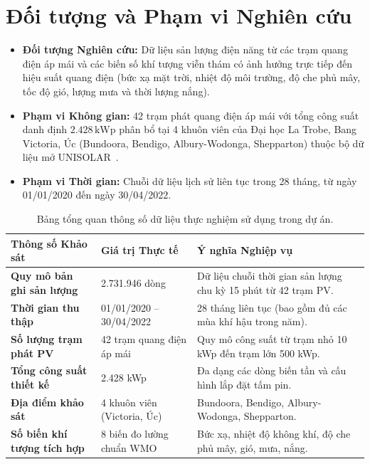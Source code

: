 \documentclass[12pt, a4paper]{report}
\begin{document}
\section{Đối tượng và Phạm vi Nghiên cứu}
\label{sec:phamvi}

\begin{itemize}[noitemsep]
    \item \textbf{Đối tượng Nghiên cứu:} Dữ liệu sản lượng điện năng từ các trạm quang điện áp mái và các biến số khí tượng viễn thám có ảnh hưởng trực tiếp đến hiệu suất quang điện (bức xạ mặt trời, nhiệt độ môi trường, độ che phủ mây, tốc độ gió, lượng mưa và thời lượng nắng).
    \item \textbf{Phạm vi Không gian:} 42 trạm phát quang điện áp mái với tổng công suất danh định $2.428\,\text{kWp}$ phân bổ tại 4 khuôn viên của Đại học La Trobe, Bang Victoria, Úc (Bundoora, Bendigo, Albury-Wodonga, Shepparton) thuộc bộ dữ liệu mở UNISOLAR~\cite{wimalaratne2022unisolar}.
    \item \textbf{Phạm vi Thời gian:} Chuỗi dữ liệu lịch sử liên tục trong 28 tháng, từ ngày 01/01/2020 đến ngày 30/04/2022.
\end{itemize}

\begin{table}[H]
\centering
\small
\renewcommand{\arraystretch}{1.25}
\begin{tabularx}{\textwidth}{@{} l l X @{}}
\toprule
\textbf{Thông số Khảo sát} & \textbf{Giá trị Thực tế} & \textbf{Ý nghĩa Nghiệp vụ} \\
\midrule
\textbf{Quy mô bản ghi sản lượng} & 2.731.946 dòng & Dữ liệu chuỗi thời gian sản lượng chu kỳ 15 phút từ 42 trạm PV. \\
\textbf{Thời gian thu thập} & 01/01/2020 -- 30/04/2022 & 28 tháng liên tục (bao gồm đủ các mùa khí hậu trong năm). \\
\textbf{Số lượng trạm phát PV} & 42 trạm quang điện áp mái & Quy mô công suất từ trạm nhỏ 10 kWp đến trạm lớn 500 kWp. \\
\textbf{Tổng công suất thiết kế} & 2.428 kWp & Đa dạng các dòng biến tần và cấu hình lắp đặt tấm pin. \\
\textbf{Địa điểm khảo sát} & 4 khuôn viên (Victoria, Úc) & Bundoora, Bendigo, Albury-Wodonga, Shepparton. \\
\textbf{Số biến khí tượng tích hợp} & 8 biến đo lường chuẩn WMO & Bức xạ, nhiệt độ không khí, độ che phủ mây, gió, mưa, nắng. \\
\bottomrule
\end{tabularx}
\caption{Bảng tổng quan thông số dữ liệu thực nghiệm sử dụng trong dự án.}
\label{tab:dataset_summary}
\end{table}
\end{document}
